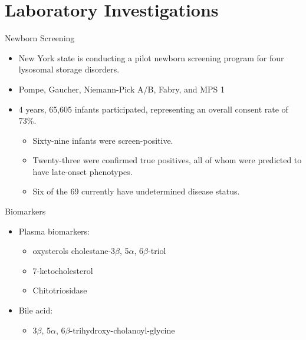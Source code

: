 \documentclass[presentation, smaller]{beamer}
\begin{document}
\section{Laboratory Investigations}
\label{sec:orgheadline20}
\begin{frame}[label={sec:orgheadline15}]{Newborn Screening}
\begin{itemize}
\item New York state is conducting a pilot newborn screening program for four lysosomal storage disorders.
\item Pompe, Gaucher, Niemann-Pick A/B, Fabry, and MPS 1

\item 4 years, 65,605 infants participated, representing an overall consent rate of 73\%.
\begin{itemize}
\item Sixty-nine infants were screen-positive.
\item Twenty-three were confirmed true positives, all of whom were predicted to have late-onset phenotypes.
\item Six of the 69 currently have undetermined disease status.
\end{itemize}
\end{itemize}
\end{frame}

\begin{frame}[label={sec:orgheadline16}]{Biomarkers}
\begin{itemize}
\item Plasma biomarkers:
\begin{itemize}
\item oxysterols cholestane-3\(\beta\), 5\(\alpha\), 6\(\beta\)-triol
\item 7-ketocholesterol
\item Chitotriosidase
\end{itemize}
\item Bile acid:
\begin{itemize}
\item 3\(\beta\), 5\(\alpha\), 6\(\beta\)-trihydroxy-cholanoyl-glycine
\end{itemize}
\end{itemize}
\end{frame}
\end{document}
